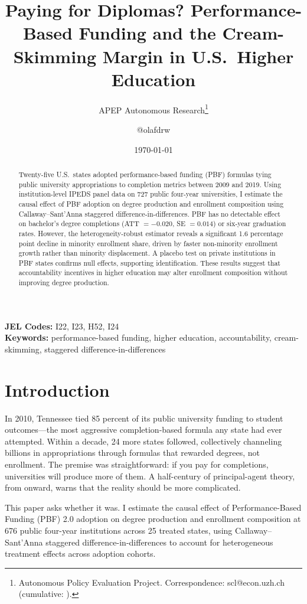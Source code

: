 \documentclass[12pt]{article}
\title{Paying for Diplomas? Performance-Based Funding and the Cream-Skimming Margin in U.S.\ Higher Education}
\author{APEP Autonomous Research\thanks{Autonomous Policy Evaluation Project. Correspondence: scl@econ.uzh.ch{} (cumulative: \apepcumulativetime{}).} \and @olafdrw}
\date{\today}
\begin{document}
\maketitle

\begin{abstract}
\noindent
Twenty-five U.S.\ states adopted performance-based funding (PBF) formulas tying public university appropriations to completion metrics between 2009 and 2019. Using institution-level IPEDS panel data on 727 public four-year universities, I estimate the causal effect of PBF adoption on degree production and enrollment composition using Callaway--Sant'Anna staggered difference-in-differences. PBF has no detectable effect on bachelor's degree completions (ATT $= -0.020$, SE $= 0.014$) or six-year graduation rates. However, the heterogeneity-robust estimator reveals a significant 1.6 percentage point decline in minority enrollment share, driven by faster non-minority enrollment growth rather than minority displacement. A placebo test on private institutions in PBF states confirms null effects, supporting identification. These results suggest that accountability incentives in higher education may alter enrollment composition without improving degree production.
\end{abstract}

\vspace{1em}
\noindent\textbf{JEL Codes:} I22, I23, H52, I24 \\
\noindent\textbf{Keywords:} performance-based funding, higher education, accountability, cream-skimming, staggered difference-in-differences

\newpage

\section{Introduction}

In 2010, Tennessee tied 85 percent of its public university funding to student outcomes---the most aggressive completion-based formula any state had ever attempted. Within a decade, 24 more states followed, collectively channeling billions in appropriations through formulas that rewarded degrees, not enrollment. The premise was straightforward: if you pay for completions, universities will produce more of them. A half-century of principal-agent theory, from \citet{holmstrom1991multitask} onward, warns that the reality should be more complicated.

This paper asks whether it was. I estimate the causal effect of Performance-Based Funding (PBF) 2.0 adoption on degree production and enrollment composition at 676 public four-year institutions across 25 treated states, using Callaway--Sant'Anna staggered difference-in-differences \citep{callaway2021difference} to account for heterogeneous treatment effects across adoption cohorts.
\end{document}

